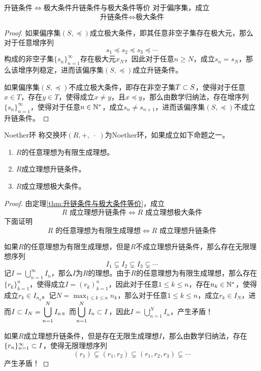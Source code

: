 \begin{theorem}{升链条件$\iff$极大条件}{升链条件与极大条件等价}
	对于偏序集，成立
	$$
	\text{升链条件}\iff \text{极大条件}
	$$
\end{theorem}

\begin{proof}
	如果偏序集$(S,\preceq)$成立极大条件，即其任意非空子集存在极大元，那么对于任意增序列
	$$
	s_1\preceq s_2\preceq s_3\preceq\cdots
	$$
	构成的非空子集$\{s_n\}_{n=1}^{\infty}$存在极大元$x_N$，因此对于任意$n\ge N$，成立$s_n=s_N$，那么该增序列稳定，进而该偏序集$(S,\preceq)$成立升链条件。
	
	如果偏序集$(S,\preceq)$不成立极大条件，即存在非空子集$T\subset S$，使得对于任意$x\in T$，存在$y\in T$，使得成立$x\ne y$，且$x\preceq y$，那么由数学归纳法，存在增序列$\{ s_n \}_{n=1}^{\infty}$，使得对于任意$n\in\mathbb{N}^*$，成立$s_{n}\ne s_{n+1}$，进而该偏序集$(S,\preceq)$不成立升链条件。
\end{proof}

\begin{definition}{Noether环}
	称交换环$(R,+,\;\cdot\;)$为Noether环，如果成立如下命题之一。
	\begin{enumerate}
		\item $R$的任意理想为有限生成理想。
		\item $R$成立理想升链条件。
		\item $R$成立理想极大条件。
	\end{enumerate}
\end{definition}

\begin{proof}
	由定理\ref{thm:升链条件与极大条件等价}，成立
	$$
	R\text{ 成立理想升链条件}\iff
	R\text{ 成立理想极大条件}
	$$
	下面证明
	$$
	R\text{ 的任意理想为有限生成理想}\iff
	R\text{ 成立理想升链条件}
	$$
	
	如果$R$的任意理想为有限生成理想，但是$R$不成立理想升链条件，那么存在无限理想序列
	$$
	I_1\subsetneq I_2 \subsetneq I_3 \subsetneq \cdots
	$$
	记$\displaystyle I=\bigcup_{n=1}^{\infty}I_n$，那么$I$为$R$的理想。由于$R$的任意理想为有限生成理想，那么存在$\{r_k\}_{k=1}^{n}$，使得成立$I=(r_k)_{k=1}^{n}$，因此对于任意$1\le k\le n$，存在$n_k\in\mathbb{N}^*$，使得成立$r_k\in I_{n_k}$。记$\displaystyle N=\max_{1\le k\le n}n_k$，那么对于任意$1\le k\le n$，成立$r_k\in I_N$，进而$\displaystyle I\subset I_N=\bigcup_{n=1}^{N}I_n$。而$\displaystyle \bigcup_{n=1}^{N}I_n\subset I$，因此$\displaystyle I=\bigcup_{n=1}^{N}I_n$，产生矛盾！
	
	如果$R$成立理想升链条件，但是存在无限生成理想$I$，那么由数学归纳法，存在$\{ r_n \}_{n=1}^{\infty}\subset I$，使得无限理想序列
	$$
	(r_1)\subsetneq (r_1,r_2)\subsetneq (r_1,r_2,r_3) \subsetneq \cdots
	$$
	产生矛盾！
\end{proof}

